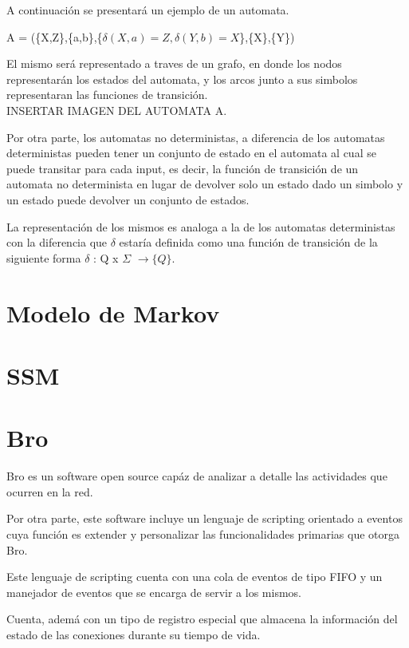 \documentclass{article}
\begin{document}
A continuaci\'on se presentar\'a un ejemplo de un automata.

A = (\{X,Z\},\{a,b\},\{$\delta(X,a)=Z,\delta(Y,b)=X$\},\{X\},\{Y\})

 El mismo ser\'a representado a traves de un grafo, en donde los nodos representar\'an los estados del automata, y los arcos junto a sus simbolos representaran las funciones de transici\'on.\\

INSERTAR IMAGEN DEL AUTOMATA A.

Por otra parte, los automatas no deterministas, a diferencia de los automatas deterministas pueden tener un conjunto de estado en el automata al cual se puede transitar para cada input, es decir, la funci\'on de transici\'on de un automata no determinista en lugar de devolver solo un estado dado un simbolo y un estado puede devolver un conjunto de estados.

La representaci\'on de los mismos es analoga a la de los automatas deterministas con la diferencia que $\delta$ estar\'ia definida como una funci\'on de transici\'on de la siguiente forma $\delta$ : Q x $\Sigma$ $\rightarrow \{Q\}.$

\section{Modelo de Markov}
\section{SSM}
\section{Bro}

Bro es un software open source cap\'az de analizar a detalle las actividades que ocurren en la red.

Por otra parte, este software incluye un lenguaje de scripting orientado a eventos cuya funci\'on es extender y personalizar las funcionalidades primarias que otorga Bro. 

Este lenguaje de scripting cuenta con una cola de eventos de tipo FIFO y un manejador de eventos que se encarga de servir a los mismos.

Cuenta, adem\'a con un tipo de registro especial que almacena la informaci\'on del estado de las conexiones durante su tiempo de vida.
\end{document}
